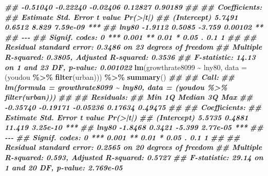 \documentclass[
]{book}
\newenvironment{Shaded}{\begin{snugshade}}{\end{snugshade}}
\newcommand{\AttributeTok}[1]{\textcolor[rgb]{0.13,0.29,0.53}{#1}}
\newcommand{\DocumentationTok}[1]{\textcolor[rgb]{0.56,0.35,0.01}{\textbf{\textit{#1}}}}
\newcommand{\FunctionTok}[1]{\textcolor[rgb]{0.13,0.29,0.53}{\textbf{#1}}}
\newcommand{\NormalTok}[1]{#1}
\newcommand{\SpecialCharTok}[1]{\textcolor[rgb]{0.81,0.36,0.00}{\textbf{#1}}}
\begin{document}
\begin{Shaded}
\begin{Highlighting}[]
\DocumentationTok{\#\# {-}0.51040 {-}0.22240 {-}0.02406  0.12827  0.90189 }
\DocumentationTok{\#\# }
\DocumentationTok{\#\# Coefficients:}
\DocumentationTok{\#\#             Estimate Std. Error t value Pr(\textgreater{}|t|)    }
\DocumentationTok{\#\# (Intercept)   5.7491     0.6512   8.829 7.59e{-}09 ***}
\DocumentationTok{\#\# lny80        {-}1.9112     0.5085  {-}3.759  0.00102 ** }
\DocumentationTok{\#\# {-}{-}{-}}
\DocumentationTok{\#\# Signif. codes:  0 \textquotesingle{}***\textquotesingle{} 0.001 \textquotesingle{}**\textquotesingle{} 0.01 \textquotesingle{}*\textquotesingle{} 0.05 \textquotesingle{}.\textquotesingle{} 0.1 \textquotesingle{} \textquotesingle{} 1}
\DocumentationTok{\#\# }
\DocumentationTok{\#\# Residual standard error: 0.3486 on 23 degrees of freedom}
\DocumentationTok{\#\# Multiple R{-}squared:  0.3805, Adjusted R{-}squared:  0.3536 }
\DocumentationTok{\#\# F{-}statistic: 14.13 on 1 and 23 DF,  p{-}value: 0.001022}
\FunctionTok{lm}\NormalTok{(growthrate8099 }\SpecialCharTok{\textasciitilde{}}\NormalTok{ lny80, }\AttributeTok{data =}\NormalTok{ (youdou }\SpecialCharTok{\%\textgreater{}\%} \FunctionTok{filter}\NormalTok{(urban))) }\SpecialCharTok{\%\textgreater{}\%} \FunctionTok{summary}\NormalTok{()}
\DocumentationTok{\#\# }
\DocumentationTok{\#\# Call:}
\DocumentationTok{\#\# lm(formula = growthrate8099 \textasciitilde{} lny80, data = (youdou \%\textgreater{}\% filter(urban)))}
\DocumentationTok{\#\# }
\DocumentationTok{\#\# Residuals:}
\DocumentationTok{\#\#      Min       1Q   Median       3Q      Max }
\DocumentationTok{\#\# {-}0.35740 {-}0.19171 {-}0.05236  0.17634  0.49475 }
\DocumentationTok{\#\# }
\DocumentationTok{\#\# Coefficients:}
\DocumentationTok{\#\#             Estimate Std. Error t value Pr(\textgreater{}|t|)    }
\DocumentationTok{\#\# (Intercept)   5.5735     0.4881  11.419 3.25e{-}10 ***}
\DocumentationTok{\#\# lny80        {-}1.8468     0.3421  {-}5.399 2.77e{-}05 ***}
\DocumentationTok{\#\# {-}{-}{-}}
\DocumentationTok{\#\# Signif. codes:  0 \textquotesingle{}***\textquotesingle{} 0.001 \textquotesingle{}**\textquotesingle{} 0.01 \textquotesingle{}*\textquotesingle{} 0.05 \textquotesingle{}.\textquotesingle{} 0.1 \textquotesingle{} \textquotesingle{} 1}
\DocumentationTok{\#\# }
\DocumentationTok{\#\# Residual standard error: 0.2565 on 20 degrees of freedom}
\DocumentationTok{\#\# Multiple R{-}squared:  0.593,  Adjusted R{-}squared:  0.5727 }
\DocumentationTok{\#\# F{-}statistic: 29.14 on 1 and 20 DF,  p{-}value: 2.769e{-}05}
\end{Highlighting}
\end{Shaded}
\end{document}
